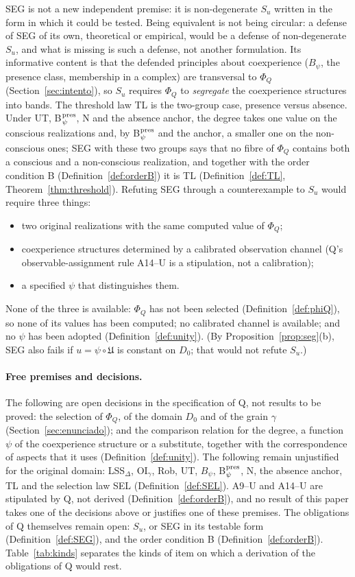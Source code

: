 SEG is not a new independent premise: it is non-degenerate $S_u$ written in the form in which it could be tested. Being equivalent is not being circular: a defense of SEG of its own, theoretical or empirical, would be a defense of non-degenerate $S_u$, and what is missing is such a defense, not another formulation. Its informative content is that the defended principles about coexperience ($B_\psi$, the presence class, membership in a complex) are transversal to $\Phi_Q$ (Section~\ref{sec:intento}), so $S_u$ requires $\Phi_Q$ to \emph{segregate} the coexperience structures into bands. The threshold law TL is the two-group case, presence versus absence. Under UT, B$_\psi^{\rm pres}$, N and the absence anchor, the degree takes one value on the conscious realizations and, by B$_\psi^{\rm pres}$ and the anchor, a smaller one on the non-conscious ones; SEG with these two groups says that no fibre of $\Phi_Q$ contains both a conscious and a non-conscious realization, and together with the order condition B (Definition~\ref{def:orderB}) it is TL (Definition~\ref{def:TL}, Theorem~\ref{thm:threshold}). Refuting SEG through a counterexample to $S_u$ would require three things:
\begin{itemize}
\item two original realizations with the same computed value of $\Phi_Q$;
\item coexperience structures determined by a calibrated observation channel (Q's observable-assignment rule A14--U is a stipulation, not a calibration);
\item a specified $\psi$ that distinguishes them.
\end{itemize}
None of the three is available: $\Phi_Q$ has not been selected (Definition~\ref{def:phiQ}), so none of its values has been computed; no calibrated channel is available; and no $\psi$ has been adopted (Definition~\ref{def:unity}). (By Proposition~\ref{prop:seg}(b), SEG also fails if $u=\psi\circ\mathfrak U$ is constant on $D_0$; that would not refute $S_u$.)

\paragraph{Free premises and decisions.} The following are open decisions in the specification of Q, not results to be proved: the selection of $\Phi_Q$, of the domain $D_0$ and of the grain $\gamma$ (Section~\ref{sec:enunciado}); and the comparison relation for the degree, a function $\psi$ of the coexperience structure or a substitute, together with the correspondence of aspects that it uses (Definition~\ref{def:unity}). The following remain unjustified for the original domain: LSS$_\Delta$, OI$_\gamma$, Rob, UT, $B_\psi$, B$_\psi^{\rm pres}$, N, the absence anchor, TL and the selection law SEL (Definition~\ref{def:SEL}). A9--U and A14--U are stipulated by Q, not derived (Definition~\ref{def:orderB}), and no result of this paper takes one of the decisions above or justifies one of these premises. The obligations of Q themselves remain open: $S_u$, or SEG in its testable form (Definition~\ref{def:SEG}), and the order condition B (Definition~\ref{def:orderB}). Table~\ref{tab:kinds} separates the kinds of item on which a derivation of the obligations of Q would rest.

